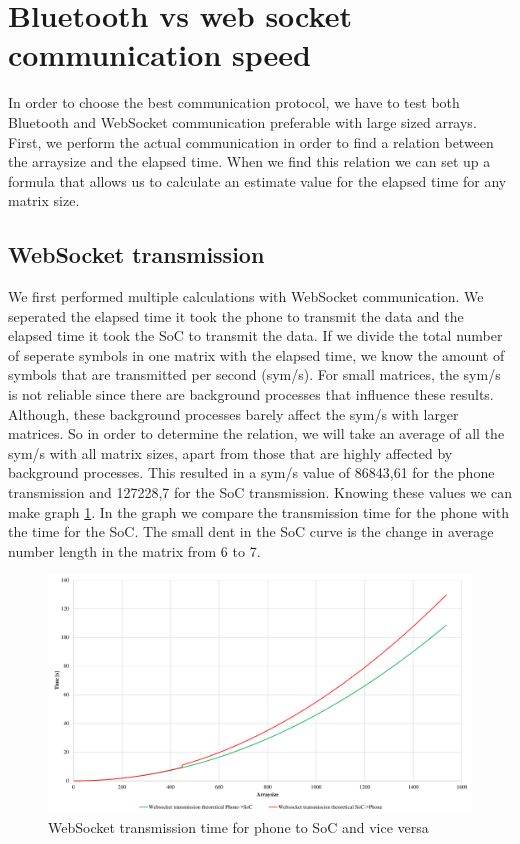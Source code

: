 \documentclass[a4paper, 11pt]{report}
\begin{document}
\section{Bluetooth vs web socket communication speed}
In order to choose the best communication protocol, we have to test both Bluetooth and WebSocket communication preferable with large sized arrays. First, we perform the actual communication in order to find a relation between the arraysize and the elapsed time. When we find this relation we can set up a formula that allows us to calculate an estimate value for the elapsed time for any matrix size.

	\subsection{WebSocket transmission}
We first performed multiple calculations with WebSocket communication. We seperated the elapsed time it took the phone to transmit the data and the elapsed time it took the SoC to transmit the data. If we divide the total number of seperate symbols in one matrix with the elapsed time, we know the amount of symbols that are transmitted per second (sym/s). For small matrices, the sym/s is not reliable since there are background processes that influence these results. Although, these background processes barely affect the sym/s with larger matrices. So in order to determine the relation, we will take an average of all the sym/s with all matrix sizes, apart from those that are highly affected by background processes. This resulted in a sym/s value of 86843,61 for the phone transmission and 127228,7 for the SoC transmission. Knowing these values we can make graph \ref{graph:websocketTime}. In the graph we compare the transmission time for the phone with the time for the SoC. The small dent in 
the SoC curve is the change in average number length in the matrix from 6 to 7.
\begin{figure}[ht]
\centering
\includegraphics[scale=0.45]{images/WebsocketTransmissionSpeed.pdf}
\caption{WebSocket transmission time for phone to SoC and vice versa}\label{graph:websocketTime}
\end{figure}
\end{document}
